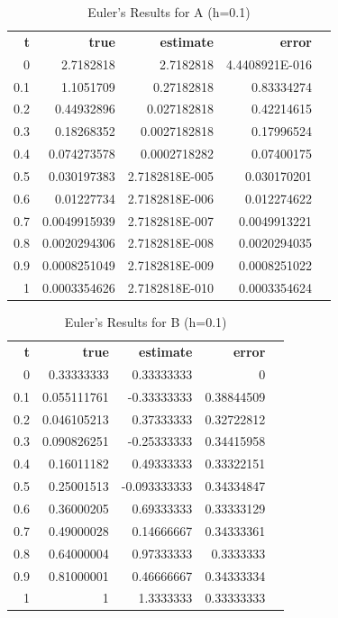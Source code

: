 \documentclass{article}
\begin{document}
\begin{table}[H]
\footnotesize
\centering
\caption{Euler's Results for A (h=0.1)}
\label{tab:a_euler}
\begin{tabular}{rrrrl}
\textbf{t} & \textbf{true} & \textbf{estimate} & \textbf{error} &  \\
0          & 2.7182818     & 2.7182818      & 4.4408921E-016  &  \\
0.1        & 1.1051709     & 0.27182818     & 0.83334274      &  \\
0.2        & 0.44932896    & 0.027182818    & 0.42214615      &  \\
0.3        & 0.18268352    & 0.0027182818   & 0.17996524      &  \\
0.4        & 0.074273578   & 0.0002718282   & 0.07400175      &  \\
0.5        & 0.030197383   & 2.7182818E-005 & 0.030170201     &  \\
0.6        & 0.01227734    & 2.7182818E-006 & 0.012274622     &  \\
0.7        & 0.0049915939  & 2.7182818E-007 & 0.0049913221    &  \\
0.8        & 0.0020294306  & 2.7182818E-008 & 0.0020294035    &  \\
0.9        & 0.0008251049  & 2.7182818E-009 & 0.0008251022    &  \\
1          & 0.0003354626  & 2.7182818E-010 & 0.0003354624    
\end{tabular}
\end{table}

\begin{table}[H]
\footnotesize
\centering
\caption{Euler's Results for B (h=0.1)}
\label{tab:b_euler}
\begin{tabular}{rrrrl}
\textbf{t} & \textbf{true} & \textbf{estimate} & \textbf{error} &  \\
0          & 0.33333333    & 0.33333333     & 0               &  \\
0.1        & 0.055111761   & -0.33333333    & 0.38844509      &  \\
0.2        & 0.046105213   & 0.37333333     & 0.32722812      &  \\
0.3        & 0.090826251   & -0.25333333    & 0.34415958      &  \\
0.4        & 0.16011182    & 0.49333333     & 0.33322151      &  \\
0.5        & 0.25001513    & -0.093333333   & 0.34334847      &  \\
0.6        & 0.36000205    & 0.69333333     & 0.33333129      &  \\
0.7        & 0.49000028    & 0.14666667     & 0.34333361      &  \\
0.8        & 0.64000004    & 0.97333333     & 0.3333333       &  \\
0.9        & 0.81000001    & 0.46666667     & 0.34333334      &  \\
1          & 1             & 1.3333333      & 0.33333333      & 
\end{tabular}
\end{table}
\end{document}
